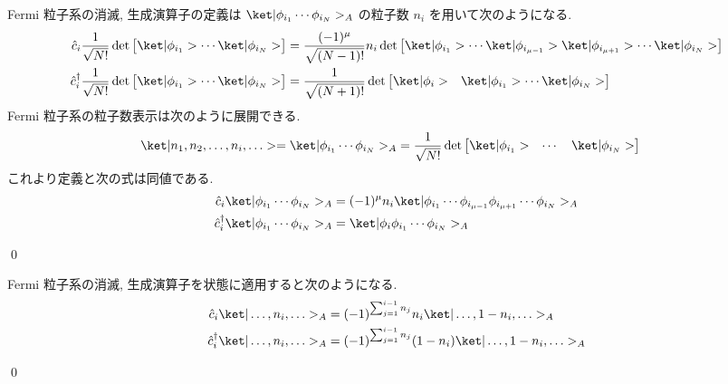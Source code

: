 \documentclass[uplatex,dvipdfmx,a4paper,11pt]{jlreq}
\makeatletter
\DeclareMathOperator{\Det}{det}
\numberwithin{equation}{section}
\theoremstyle{definition}
\renewenvironment{proof}[1][\proofname]{\par
  \normalfont
  \topsep6\p@\@plus6\p@ \trivlist
  \item[\hskip\labelsep{\bfseries #1}\@addpunct{\bfseries}]\ignorespaces\quad\par
}{
  \qed\endtrivlist\@endpefalse
}
\renewcommand\proofname{証明}
\makeatother
\begin{document}
\begin{proof}
  Fermi 粒子系の消滅, 生成演算子の定義は $\ket|\phi_{i_1}\cdots\phi_{i_N}>_A$ の粒子数 $n_i$ を用いて次のようになる.
  \begin{align}
    \hat{c}_i\frac{1}{\sqrt{N!}}\Det\begin{bmatrix}\ket|\phi_{i_1}> \cdots \ket|\phi_{i_N}>\end{bmatrix}         & = \frac{(-1)^\mu}{\sqrt{(N-1)!}}n_i\Det\begin{bmatrix}\ket|\phi_{i_1}> \cdots \ket|\phi_{i_{\mu-1}}>\ket|\phi_{i_{\mu+1}}>\cdots\ket|\phi_{i_N}>\end{bmatrix} \\
    \hat{c}_i^\dagger\frac{1}{\sqrt{N!}}\Det\begin{bmatrix}\ket|\phi_{i_1}> \cdots \ket|\phi_{i_N}>\end{bmatrix} & = \frac{1}{\sqrt{(N+1)!}}\Det\begin{bmatrix}\ket|\phi_i> & \ket|\phi_{i_1}> \cdots \ket|\phi_{i_N}>\end{bmatrix}
  \end{align}
  Fermi 粒子系の粒子数表示は次のように展開できる.
  \begin{align}
    \ket|n_1,n_2,\ldots,n_i,\ldots> = \ket|\phi_{i_1}\cdots\phi_{i_N}>_A & = \frac{1}{\sqrt{N!}}\Det\begin{bmatrix}\ket|\phi_{i_1}> & \cdots & \ket|\phi_{i_N}>\end{bmatrix}
  \end{align}
  これより定義と次の式は同値である.
  \begin{align}
    \hat{c}_i\ket|\phi_{i_1}\cdots\phi_{i_N}>_A         & = (-1)^\mu n_i\ket|\phi_{i_1}\cdots\phi_{i_{\mu-1}}\phi_{i_{\mu+1}}\cdots\phi_{i_N}>_A \\
    \hat{c}_i^\dagger\ket|\phi_{i_1}\cdots\phi_{i_N}>_A & = \ket|\phi_i\phi_{i_1}\cdots\phi_{i_N}>_A
  \end{align}
\end{proof}

\begin{theorem}[Q21-51]
  Fermi 粒子系の消滅, 生成演算子を状態に適用すると次のようになる.
  \begin{align}
    \hat{c}_i\ket|\ldots,n_i,\ldots>_A         & = (-1)^{\sum_{j=1}^{i-1}n_j} n_i\ket|\ldots,1-n_i,\ldots>_A    \\
    \hat{c}_i^\dagger\ket|\ldots,n_i,\ldots>_A & = (-1)^{\sum_{j=1}^{i-1}n_j}(1-n_i)\ket|\ldots,1-n_i,\ldots>_A
  \end{align}
\end{theorem}
\begin{proof}
\end{proof}
\end{document}
